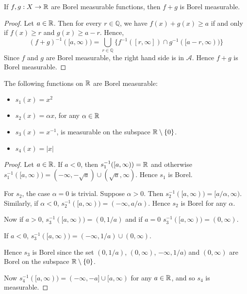 \documentclass{unswmaths}
\begin{document}
\begin{lemma}
\label{fnsonR}
     If $f,g:X\rightarrow \mathbb{R}$ are Borel measurable functions, then $f+g$ is Borel
     measurable.
\end{lemma}
\begin{proof}
     Let $a \in \mathbb{R}$. Then for every $r \in \mathbb{Q}$, we
     have $f(x) + g(x) \geq a$ if and only if $f(x) \geq r$ and $g(x) \geq a-r$. Hence,
     \begin{equation*}
         (f+g)^{-1}([a,\infty)) = \bigcup_{r \in \mathbb{Q}} \{ f^{-1}([r,\infty])\cap g^{-1}([a-r,\infty))\}
     \end{equation*}
     Since $f$ and $g$ are Borel measurable, the right hand side is in $\mathcal{A}$.
     Hence $f+g$ is Borel measurable.
\end{proof}
\begin{lemma}
    The following functions on $\mathbb{R}$ are Borel measurable:
    \begin{itemize}
        \item{} $s_1(x) = x^2$
        \item{} $s_2(x) = \alpha x$, for any $\alpha \in \mathbb{R}$
        \item{} $s_3(x) = x^{-1}$, is measurable on the subspace $\mathbb{R}\setminus\{0\}$.
        \item{} $s_4(x) = |x|$
    \end{itemize}
\end{lemma}
\begin{proof}
    Let $a \in \mathbb{R}$. If $a < 0$, then $s_1^{-1}([a,\infty)) = \mathbb{R}$ and otherwise $s_1^{-1}([a,\infty)) = (-\infty,-\sqrt{a})\cup(\sqrt{a},\infty)$.
    Hence $s_1$ is Borel.
    
    For $s_2$, the case $\alpha = 0$ is trivial. Suppose $\alpha > 0$. Then $s_2^{-1}([a,\infty)) = [a/\alpha,\infty)$. Similarly,
    if $\alpha < 0$, $s_2^{-1}([a,\infty)) = (-\infty, a/\alpha)$. Hence $s_2$ is Borel for any $\alpha$.
    
    Now if $a > 0$, $s_3^{-1}([a,\infty)) = (0,1/a)$ and if $a = 0$ $s_3^{-1}([a,\infty)) = (0,\infty)$.
    
    If $a < 0$, $s_3^{-1}([a,\infty)) = (-\infty,1/a)\cup (0,\infty)$.
    
    Hence $s_3$ is Borel since the set $(0,1/a)$, $(0,\infty)$, $-\infty,1/a)$ and $(0,\infty)$ are
    Borel on the subspace $\mathbb{R}\setminus \{0\}$.
    
    Now $s_4^{-1}([a,\infty)) = (-\infty,-a]\cup[a,\infty)$ for any $a \in \mathbb{R}$, and 
    so $s_4$ is measurable.
\end{proof}
\end{document}
